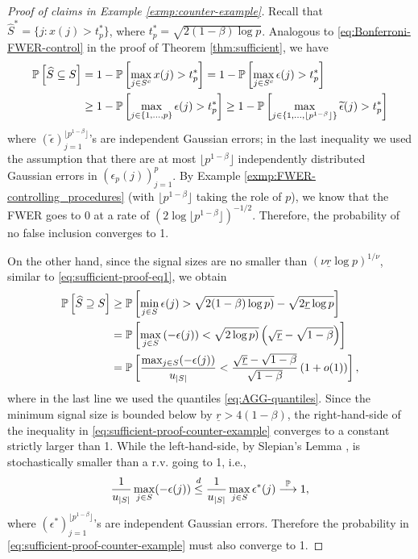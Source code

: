 \begin{proof}[Proof of claims in Example \ref{exmp:counter-example}]
Recall that $\widehat{S}^* = \{j:x(j)>t_p^*\}$, where $t_p^* = \sqrt{2(1-\beta)\log{p}}$. 
Analogous to \eqref{eq:Bonferroni-FWER-control} in the proof of Theorem \ref{thm:sufficient}, we have
\begin{align*}
    \P\left[\widehat{S} \subseteq S\right] 
        &= 1 - \P\left[\max_{j\in S^c}x(j) > t_p^*\right] 
        = 1 - \P\left[\max_{j\in S^c}\epsilon(j) > t_p^*\right] \nonumber \\
        &\ge 1 - \P\left[\max_{j\in\{1,\ldots,p\}}\epsilon(j) > t_p^*\right] 
        \ge 1 - \P\left[\max_{j\in\{1,\ldots,\lfloor p^{1-\beta}\rfloor\}}\widetilde{\epsilon}(j) > t_p^*\right]
\end{align*}
where $\left(\widetilde{\epsilon}\right)_{j=1}^{\lfloor p^{1-\beta}\rfloor}$'s are independent Gaussian errors; in the last inequality we used the assumption that there are at most $\lfloor p^{1-\beta}\rfloor$ independently distributed Gaussian errors in $\left(\epsilon_p(j)\right)_{j=1}^p$.
By Example \ref{exmp:FWER-controlling_procedures} (with $\lfloor p^{1-\beta}\rfloor$ taking the role of $p$), we know that the FWER goes to 0 at a rate of 
$\left(2\log{\lfloor p^{1-\beta}\rfloor}\right)^{-1/2}$.
Therefore, the probability of no false inclusion converges to 1.


On the other hand, since the signal sizes are no smaller than $(\nu\underline{r}\log p)^{1/\nu}$, similar to \eqref{eq:sufficient-proof-eq1}, we obtain
\begin{align}
    \P\left[\widehat{S} \supseteq S\right] 
    &\ge \P\left[\min_{j\in S}\epsilon(j) > \sqrt{2(1-\beta)\log{p})} - \sqrt{2\underline{r}\log{p}} \right] \nonumber \\
    &= \P\left[\max_{j\in S}\left(-\epsilon(j)\right) < \sqrt{2\log{p})}\left(\sqrt{\underline{r}}-\sqrt{1-\beta}\right) \right] \nonumber \\
    &= \P\left[\frac{\max_{j\in S}(-\epsilon(j))}{u_{|S|}} < \frac{\sqrt{\underline{r}}-\sqrt{1-\beta}}{\sqrt{1-\beta}}\left(1+o(1)\right) \right], \label{eq:sufficient-proof-counter-example}
\end{align}
where in the last line we used the quantiles \eqref{eq:AGG-quantiles}.
Since the minimum signal size is bounded below by $\underline{r} > 4(1-\beta)$, the right-hand-side of the inequality in \eqref{eq:sufficient-proof-counter-example} converges to a constant strictly larger than 1. While the left-hand-side, by Slepian's Lemma \cite{slepian1962one}, is stochastically smaller than a r.v. going to 1, i.e.,
\begin{equation}
  \frac{1}{u_{|S|}} \max_{j\in S}(-\epsilon(j)) \stackrel{d}{\le} \frac{1}{u_{|S|}} \max_{j\in S} \epsilon^*(j) \stackrel{\P}{\longrightarrow} 1,
\end{equation}
where $\left({\epsilon^*}\right)_{j=1}^{\lfloor p^{1-\beta}\rfloor}$'s are independent Gaussian errors.
Therefore the probability in \eqref{eq:sufficient-proof-counter-example} must also converge to 1.
\end{proof}
